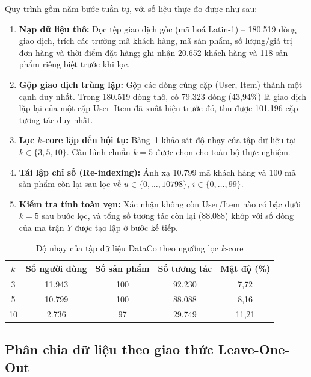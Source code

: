 Quy trình gồm năm bước tuần tự, với số liệu thực đo được như sau:
\begin{enumerate}
    \item \textbf{Nạp dữ liệu thô:} Đọc tệp giao dịch gốc (mã hoá Latin-1) -- 180.519 dòng giao dịch, trích các trường mã khách hàng, mã sản phẩm, số lượng/giá trị đơn hàng và thời điểm đặt hàng; ghi nhận 20.652 khách hàng và 118 sản phẩm riêng biệt trước khi lọc.
    \item \textbf{Gộp giao dịch trùng lặp:} Gộp các dòng cùng cặp (User, Item) thành một cạnh duy nhất. Trong 180.519 dòng thô, có 79.323 dòng (43,94\%) là giao dịch lặp lại của một cặp User--Item đã xuất hiện trước đó, thu được 101.196 cặp tương tác duy nhất.
    \item \textbf{Lọc $k$-core lặp đến hội tụ:} Bảng~\ref{tab:kcore_dataco} khảo sát độ nhạy của tập dữ liệu tại $k \in \{3, 5, 10\}$. Cấu hình chuẩn $k=5$ được chọn cho toàn bộ thực nghiệm.
    \item \textbf{Tái lập chỉ số (Re-indexing):} Ánh xạ 10.799 mã khách hàng và 100 mã sản phẩm còn lại sau lọc về $u \in \{0,\dots,10798\}$, $i \in \{0,\dots,99\}$.
    \item \textbf{Kiểm tra tính toàn vẹn:} Xác nhận không còn User/Item nào có bậc dưới $k=5$ sau bước lọc, và tổng số tương tác còn lại (88.088) khớp với số dòng của ma trận $Y$ được tạo lập ở bước kế tiếp.
\end{enumerate}

\begin{table}[htbp]
    \centering
    \caption{Độ nhạy của tập dữ liệu DataCo theo ngưỡng lọc $k$-core}
    \label{tab:kcore_dataco}
    \begin{tabular}{|c|c|c|c|c|}
        \hline
        \textbf{$k$} & \textbf{Số người dùng} & \textbf{Số sản phẩm} & \textbf{Số tương tác} & \textbf{Mật độ (\%)} \\
        \hline
        3 & 11.943 & 100 & 92.230 & 7,72 \\
        \hline
        5 & 10.799 & 100 & 88.088 & 8,16 \\
        \hline
        10 & 2.736 & 97 & 29.749 & 11,21 \\
        \hline
    \end{tabular}
\end{table}

\subsection{Phân chia dữ liệu theo giao thức Leave-One-Out}
\label{subsec:split_sampling}

